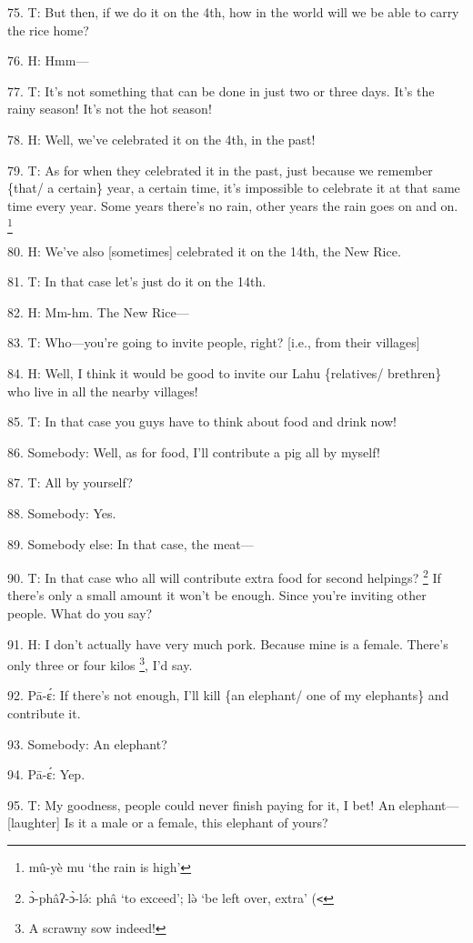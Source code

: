 75. T: But then, if we do it on the 4th, how in the world will we be able to carry
the rice home?

76. H: Hmm---

77. T: It's not something that can be done in just two or three days.  It's the
rainy season!  It's not the hot season!

78. H: Well, we've celebrated it on the 4th, in the past!

79. T: As for when they celebrated it in the past, just because we remember \{that/
a certain\} year, a certain time, it's impossible to celebrate it at that same
time every year.  Some years there's no rain, other years the rain goes on and
on. \footnote{mû-yè mu `the rain is high'}

80. H: We've also [sometimes] celebrated it on the 14th, the New Rice.

81. T: In that case let's just do it on the 14th.

82. H: Mm-hm.  The New Rice---

83. T: Who---you're going to invite people, right? [i.e., from their villages]

84. H: Well, I think it would be good to invite our Lahu \{relatives/ brethren\}
who live in all the nearby villages!

85. T: In that case you guys have to think about food and drink now!

86. Somebody: Well, as for food, I'll contribute a pig all by myself!

87. T: All by yourself?

88.  Somebody: Yes.

89. Somebody else: In that case, the meat---

90. T: In that case who all will contribute extra food for second helpings? \footnote{ɔ̀-phâʔ-ɔ̀-lə́: phâ `to exceed'; lə̀ `be left over, extra' (\texttt{<}}
If there's only a small amount it won't be enough.  Since you're inviting other
people.  What do you say?

91. H: I don't actually have very much pork.  Because mine is a female.  There's
only three or four kilos \footnote{A scrawny sow indeed!}, I'd say.

92. Pā-ɛ́: If there's not enough, I'll kill \{an elephant/ one of my elephants\}
and contribute it.

93. Somebody: An elephant?

94. Pā-ɛ́: Yep.

95. T: My goodness, people could never finish paying for it, I bet!  An elephant---[laughter]
Is it a male or a female, this elephant of yours?

